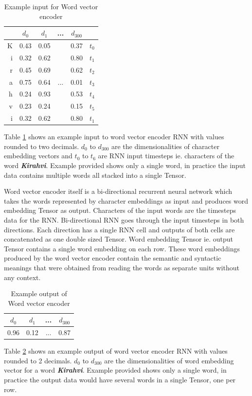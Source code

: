 \documentclass[12pt,a4paper,english
]{tutthesis}
\begin{document}
\begin{table}[htbp]
\caption{Example input for Word vector encoder}
\label{table:word_vector_encoder_input}
\centering
\begin{tabular}{|r|c|c|c|c|l|}
  \hline
  & $d_0$ & $d_1$ & ... & $d_{300}$ & \\
  \hline
  K & 0.43 & 0.05 & & 0.37 & $t_0$ \\
  i & 0.32 & 0.62 & & 0.80 & $t_1$ \\
  r & 0.45 & 0.69 & & 0.62 & $t_2$ \\
  a & 0.75 & 0.64 & ... & 0.01 & $t_3$ \\
  h & 0.24 & 0.93 & & 0.53 & $t_4$ \\
  v & 0.23 & 0.24 & & 0.15 & $t_5$ \\
  i & 0.32 & 0.62 & & 0.80 & $t_1$ \\
  \hline
\end{tabular}
\end{table}
Table \ref{table:word_vector_encoder_input} shows an example input to word vector encoder RNN with values rounded to two decimals. $d_0$ to $d_{300}$ are the dimensionalities of character embedding vectors and $t_0$ to $t_6$ are RNN input timesteps ie. characters of the word \textbf{\textit{Kirahvi}}. Example provided shows only a single word, in practice the input data contains multiple words all stacked into a single Tensor.

Word vector encoder itself is a bi-directional recurrent neural network which takes the words represented by character embeddings as input and produces word embedding Tensor as output. Characters of the input words are the timesteps data for the RNN. Bi-directional RNN goes through the input timesteps in both directions. Each direction has a single RNN cell and outputs of both cells are concatenated as one double sized Tensor. Word embedding Tensor ie. output Tensor contains a single word embedding on each row. These word embeddings produced by the word vector encoder contain the semantic and syntactic meanings that were obtained from reading the words as separate units without any context.

\begin{table}[htbp]
\caption{Example output of Word vector encoder}
\label{table:word_vector_encoder_output}
\centering
\begin{tabular}{|c|c|c|c|}
  \hline
  $d_0$ & $d_1$ & ... & $d_{300}$ \\
  \hline
  0.96 & 0.12 & ... & 0.87 \\
  \hline
\end{tabular}
\end{table}
Table \ref{table:word_vector_encoder_output} shows an example output of word vector encoder RNN with values rounded to 2 decimals. $d_0$ to $d_{300}$ are the dimensionalities of word embedding vector for a word \textbf{\textit{Kirahvi}}. Example provided shows only a single word, in practice the output data would have several words in a single Tensor, one per row.
\end{document}
